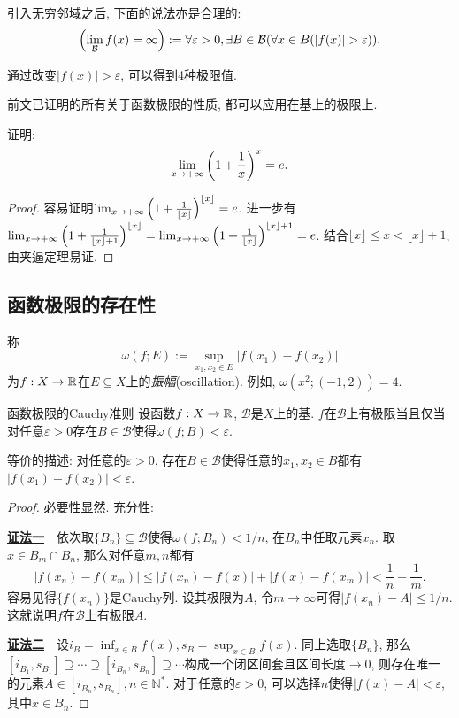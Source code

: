 引入无穷邻域之后, 下面的说法亦是合理的: $$\ssb{\lim_{\mathcal{B}} f(x) = \infty }:=\forall \varepsilon > 0, \exists B \in \mathcal{B} (\forall x \in B (|f(x)|>\varepsilon)).$$

通过改变$|f(x)|>\varepsilon$, 可以得到4种极限值. 

前文已证明的所有关于函数极限的性质, 都可以应用在基上的极限上. 

\begin{example}
	证明: $$\lim_{x\to +\infty} \left( 1+\frac{1}{x} \right)^x = e.$$
\end{example}
\begin{proof}
	容易证明$\lim_{x\to +\infty} \left( 1+\frac{1}{\lfloor x \rfloor} \right)^{\lfloor x \rfloor} = e$. 进一步有$\lim_{x\to +\infty} \left( 1+\frac{1}{\lfloor x \rfloor + 1} \right)^{\lfloor x \rfloor} = \lim_{x\to +\infty} \left( 1+\frac{1}{\lfloor x \rfloor} \right)^{\lfloor x \rfloor + 1} = e$. 结合$\lfloor x \rfloor \leq x < \lfloor x \rfloor +1$, 由夹逼定理易证. 
\end{proof}

\subsection{函数极限的存在性}

称$$\omega (f;E):=\sup_{x_1,x_2 \in E} |f(x_1)-f(x_2)|$$为$f:X \to \mathbb{R}$在$E \subseteq X$上的\textit{振幅}(oscillation). 例如, $\omega (x^2;(-1,2))=4$. 

\begin{theorem}{函数极限的Cauchy准则}
	设函数$f:X \to \mathbb{R}$, $\mathcal{B}$是$X$上的基. $f$在$\mathcal{B}$上有极限当且仅当对任意$\varepsilon >0$存在$B \in \mathcal{B}$使得$\omega (f;B) < \varepsilon$. 
\end{theorem}
\begin{remark}
	等价的描述: 对任意的$\varepsilon > 0$, 存在$B \in \mathcal{B}$使得任意的$x_1,x_2 \in B$都有$|f(x_1)-f(x_2)|<\varepsilon$. 
\end{remark}
\begin{proof}
	必要性显然. 充分性: 
	
	\underline{\textbf{证法一}}~~依次取$\{ B_n \} \subseteq \mathcal{B}$使得$\omega (f;B_n)<1/n$, 在$B_n$中任取元素$x_n$. 取$x \in B_m \cap B_n$, 那么对任意$m,n$都有$$|f(x_n)-f(x_m)| \leq |f(x_n)-f(x)| + |f(x)-f(x_m)| < \frac{1}{n} + \frac{1}{m}. $$
	容易见得$\{ f(x_n) \}$是Cauchy列. 设其极限为$A$, 令$m\to \infty$可得$|f(x_n)-A| \leq 1/n$. 这就说明$f$在$\mathcal{B}$上有极限$A$. 
	
	\underline{\textbf{证法二}}~~设$i_B = \inf_{x \in B}f(x), s_B = \sup_{x \in B}f(x)$. 同上选取$\{ B_n \}$, 那么$[i_{B_1},s_{B_1}] \supseteq \cdots \supseteq [i_{B_n},s_{B_n}] \supseteq \cdots$构成一个闭区间套且区间长度$\to 0$, 则存在唯一的元素$A \in [i_{B_n},s_{B_n}], n\in \mathbb{N}^*$. 对于任意的$\varepsilon >0$, 可以选择$n$使得$|f(x)-A|<\varepsilon$, 其中$x \in B_n$. 
\end{proof}

